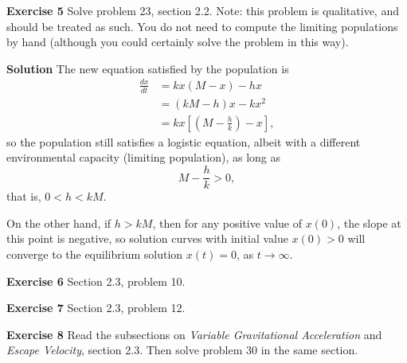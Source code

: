 \documentclass[12pt,oneside]{exam}
\newenvironment{exercise}[1]{\vspace{.1in}\noindent\textbf{Exercise #1 \hspace{.05em}}}{}
\newenvironment{newsolution}{\vspace{.1in}\noindent\textbf{Solution \hspace{.05em}}}{}
\begin{document}
\begin{exercise}{5}
Solve problem 23, section 2.2. Note: this problem is qualitative, and should be treated as such. You do not need to compute the limiting populations by hand (although you could certainly solve the problem in this way). 
\end{exercise}

\begin{newsolution}
The new equation satisfied by the population is 
\begin{align*}
\frac{dx}{dt} & = kx(M-x) - hx \\
& =(kM-h)x - kx^2 \\
& = kx\left[ \left(M - \frac{h}{k}\right) - x \right],
\end{align*}
so the population still satisfies a logistic equation, albeit with a different environmental capacity (limiting population), as long as 
\begin{equation*}
M- \frac{h}{k} > 0, 
\end{equation*}
that is, $0<h<kM$. 

On the other hand, if $h > kM$, then for any positive value of $x(0)$, the slope at this point is negative, so solution curves with initial value $x(0)>0$ will converge to the equilibrium solution $x(t)=0$, as $t \to \infty$. 
\end{newsolution}

\begin{exercise}{6} 
Section 2.3, problem 10. 
\end{exercise}

\begin{exercise}{7}
Section 2.3, problem 12.
\end{exercise}

\begin{exercise}{8}
Read the subsections on \textit{Variable Gravitational Acceleration} and \textit{Escape Velocity}, section 2.3. Then solve problem 30 in the same section. 
\end{exercise}
\end{document}
